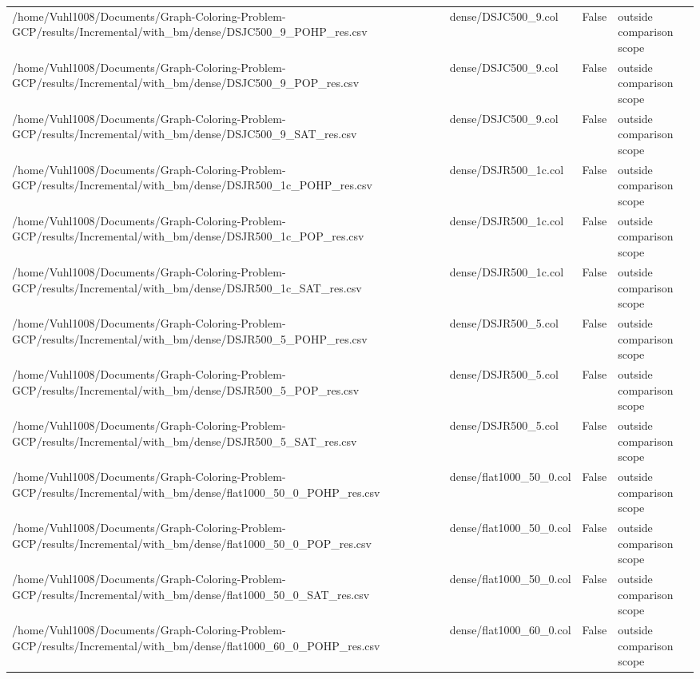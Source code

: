 \begin{table}[htbp]
\begin{tabular}{llll}
/home/Vuhl1008/Documents/Graph-Coloring-Problem-GCP/results/Incremental/with\_bm/dense/DSJC500\_9\_POHP\_res.csv & dense/DSJC500\_9.col & False & outside comparison scope \\
/home/Vuhl1008/Documents/Graph-Coloring-Problem-GCP/results/Incremental/with\_bm/dense/DSJC500\_9\_POP\_res.csv & dense/DSJC500\_9.col & False & outside comparison scope \\
/home/Vuhl1008/Documents/Graph-Coloring-Problem-GCP/results/Incremental/with\_bm/dense/DSJC500\_9\_SAT\_res.csv & dense/DSJC500\_9.col & False & outside comparison scope \\
/home/Vuhl1008/Documents/Graph-Coloring-Problem-GCP/results/Incremental/with\_bm/dense/DSJR500\_1c\_POHP\_res.csv & dense/DSJR500\_1c.col & False & outside comparison scope \\
/home/Vuhl1008/Documents/Graph-Coloring-Problem-GCP/results/Incremental/with\_bm/dense/DSJR500\_1c\_POP\_res.csv & dense/DSJR500\_1c.col & False & outside comparison scope \\
/home/Vuhl1008/Documents/Graph-Coloring-Problem-GCP/results/Incremental/with\_bm/dense/DSJR500\_1c\_SAT\_res.csv & dense/DSJR500\_1c.col & False & outside comparison scope \\
/home/Vuhl1008/Documents/Graph-Coloring-Problem-GCP/results/Incremental/with\_bm/dense/DSJR500\_5\_POHP\_res.csv & dense/DSJR500\_5.col & False & outside comparison scope \\
/home/Vuhl1008/Documents/Graph-Coloring-Problem-GCP/results/Incremental/with\_bm/dense/DSJR500\_5\_POP\_res.csv & dense/DSJR500\_5.col & False & outside comparison scope \\
/home/Vuhl1008/Documents/Graph-Coloring-Problem-GCP/results/Incremental/with\_bm/dense/DSJR500\_5\_SAT\_res.csv & dense/DSJR500\_5.col & False & outside comparison scope \\
/home/Vuhl1008/Documents/Graph-Coloring-Problem-GCP/results/Incremental/with\_bm/dense/flat1000\_50\_0\_POHP\_res.csv & dense/flat1000\_50\_0.col & False & outside comparison scope \\
/home/Vuhl1008/Documents/Graph-Coloring-Problem-GCP/results/Incremental/with\_bm/dense/flat1000\_50\_0\_POP\_res.csv & dense/flat1000\_50\_0.col & False & outside comparison scope \\
/home/Vuhl1008/Documents/Graph-Coloring-Problem-GCP/results/Incremental/with\_bm/dense/flat1000\_50\_0\_SAT\_res.csv & dense/flat1000\_50\_0.col & False & outside comparison scope \\
/home/Vuhl1008/Documents/Graph-Coloring-Problem-GCP/results/Incremental/with\_bm/dense/flat1000\_60\_0\_POHP\_res.csv & dense/flat1000\_60\_0.col & False & outside comparison scope \\

\end{tabular}
\end{table}
